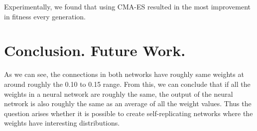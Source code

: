 \documentclass[12pt]{article}
\begin{document}
Experimentally, we found that using CMA-ES resulted in the most improvement in fitness every generation.

\section{Conclusion. Future Work.}
\label{conclusion}

As we can see, the connections in both networks
have roughly same weights
at around roughly the 0.10 to 0.15 range.
From this, we can conclude that
if all the weights in a neural network are roughly the same,
the output of the neural network
is also roughly the same as an average
of all the weight values.
Thus the question arises whether it is
possible to create self-replicating networks
where the weights have interesting distributions. 

\renewcommand{\refname}{\section{References}}


\end{document}
